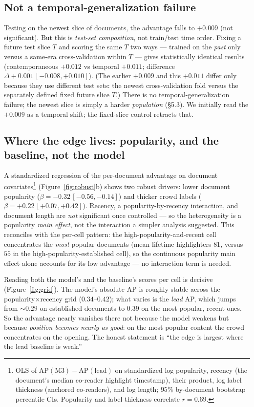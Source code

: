 \documentclass[11pt]{article}
\begin{document}
\subsection{Not a temporal-generalization failure}
Testing on the newest slice of documents, the advantage falls to $+0.009$ (not significant). But
this is \emph{test-set composition}, not train/test time order. Fixing a future test slice $T$
and scoring the same $T$ two ways --- trained on the \emph{past} only versus a same-era
cross-validation within $T$ --- gives statistically identical results (contemporaneous $+0.012$
vs temporal $+0.011$; difference $\Delta +0.001\,[-0.008,+0.010]$). (The earlier $+0.009$ and this
$+0.011$ differ only because they use different test sets: the newest cross-validation fold versus
the separately defined fixed future slice $T$.) There is no temporal-generalization failure; the
newest slice is simply a harder \emph{population} (\S5.3). We initially read the $+0.009$ as a
temporal shift; the fixed-slice control retracts that.

\subsection{Where the edge lives: popularity, and the baseline, not the model}
A standardized regression of the per-document advantage on document
covariates\footnote{OLS of $\mathrm{AP}(\text{M3})-\mathrm{AP}(\text{lead})$ on standardized log
popularity, recency (the document's median co-reader highlight timestamp), their product, log
label thickness (anchored co-readers), and log length; $95\%$ by-document bootstrap percentile
CIs. Popularity and label thickness correlate $r=0.69$.} (Figure~\ref{fig:robust}b) shows two
robust drivers: lower document popularity ($\beta=-0.32\,[-0.56,-0.14]$) and thicker crowd labels
($\beta=+0.22\,[+0.07,+0.42]$). Recency, a popularity-by-recency interaction, and document length
are \emph{not} significant once controlled --- so the heterogeneity is a popularity \emph{main
effect}, not the interaction a simpler analysis suggested. This reconciles with the per-cell
pattern: the high-popularity-and-recent cell concentrates the \emph{most} popular documents (mean
lifetime highlighters $81$, versus $55$ in the high-popularity-established cell), so the
continuous popularity main effect alone accounts for its low advantage --- no interaction term is
needed.

Reading both the model's and the baseline's scores per cell is decisive (Figure~\ref{fig:grid}).
The model's absolute AP is roughly stable across the popularity$\times$recency grid
($0.34$--$0.42$); what varies is the \emph{lead} AP, which jumps from $\sim$$0.29$ on established
documents to $0.39$ on the most popular, recent ones. So the advantage nearly vanishes there not
because the model weakens but because \emph{position becomes nearly as good}: on the most popular
content the crowd concentrates on the opening. The honest statement is ``the edge is largest
where the lead baseline is weak.''
\end{document}
